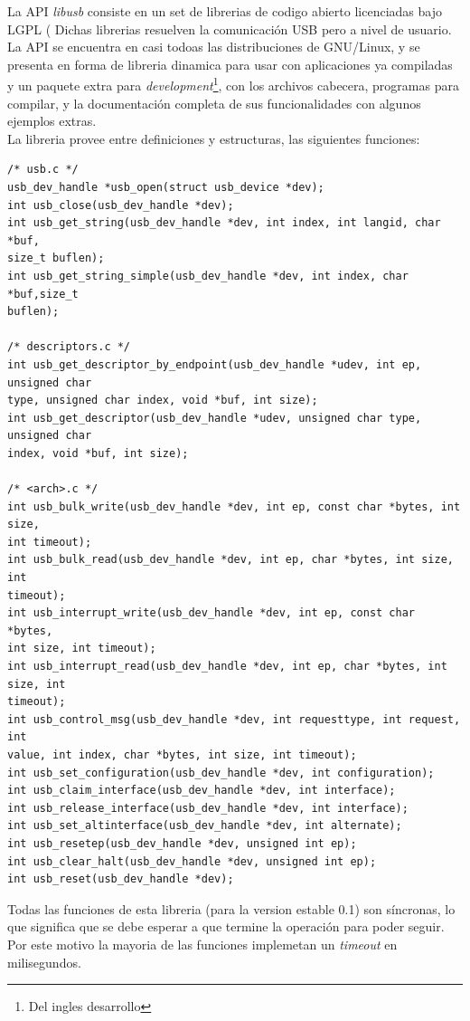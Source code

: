 La API \emph{libusb} consiste en un set de librerias de codigo abierto
licenciadas bajo LGPL (%
Dichas librerias resuelven la comunicaci\'on USB pero a nivel de usuario.
La API se encuentra en casi todoas las distribuciones de GNU/Linux, y se
presenta en forma de libreria dinamica para usar con aplicaciones ya
compiladas y un paquete extra para \emph{development}\footnote{Del ingles
desarrollo}, con los archivos cabecera, programas para compilar, y
la documentaci\'on completa de sus funcionalidades con algunos ejemplos
extras. \\

La libreria provee entre definiciones y estructuras, las siguientes funciones:



\begin{lstlisting}
/* usb.c */
usb_dev_handle *usb_open(struct usb_device *dev);
int usb_close(usb_dev_handle *dev);
int usb_get_string(usb_dev_handle *dev, int index, int langid, char *buf,
size_t buflen);
int usb_get_string_simple(usb_dev_handle *dev, int index, char *buf,size_t
buflen);

/* descriptors.c */
int usb_get_descriptor_by_endpoint(usb_dev_handle *udev, int ep, unsigned char
type, unsigned char index, void *buf, int size);
int usb_get_descriptor(usb_dev_handle *udev, unsigned char type, unsigned char
index, void *buf, int size);

/* <arch>.c */
int usb_bulk_write(usb_dev_handle *dev, int ep, const char *bytes, int size,
int timeout);
int usb_bulk_read(usb_dev_handle *dev, int ep, char *bytes, int size, int
timeout);
int usb_interrupt_write(usb_dev_handle *dev, int ep, const char *bytes,
int size, int timeout);
int usb_interrupt_read(usb_dev_handle *dev, int ep, char *bytes, int size, int
timeout);
int usb_control_msg(usb_dev_handle *dev, int requesttype, int request, int
value, int index, char *bytes, int size, int timeout);
int usb_set_configuration(usb_dev_handle *dev, int configuration);
int usb_claim_interface(usb_dev_handle *dev, int interface);
int usb_release_interface(usb_dev_handle *dev, int interface);
int usb_set_altinterface(usb_dev_handle *dev, int alternate);
int usb_resetep(usb_dev_handle *dev, unsigned int ep);
int usb_clear_halt(usb_dev_handle *dev, unsigned int ep);
int usb_reset(usb_dev_handle *dev);
\end{lstlisting}


Todas las funciones de esta libreria (para la version estable 0.1) son
s\'incronas, lo que significa que se debe esperar a que termine la operaci\'on
para poder seguir. Por este motivo la mayoria de las funciones implemetan un
\emph{timeout} en milisegundos.\\

